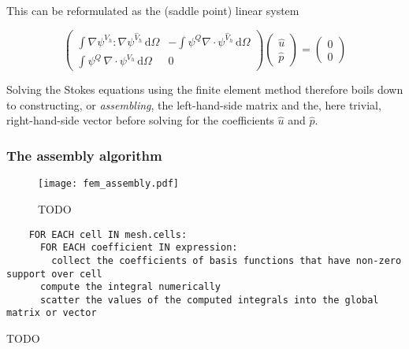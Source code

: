 \documentclass[thesis]{subfiles}
\begin{document}
This can be reformulated as the (saddle point) linear system

\begin{equation}
  \left (
  \begin{array}{c|c}
    \int \nabla \psi^{V_h} : \nabla \psi^{\hat V_h} \, \textrm{d}\Omega
    &
    - \int \psi^Q \nabla \cdot \psi^{\hat V_h} \, \textrm{d}\Omega \\
    \hline
    \int \psi^Q \, \nabla \cdot \psi^{V_h} \, \textrm{d}\Omega
    &
    0
  \end{array}
  \right )
  \left (
  \begin{array}{c}
    \hat u \\
    \hline
    \hat p
  \end{array}
  \right )
  =
  \left (
  \begin{array}{c}
    0 \\ \hline 0
  \end{array}
  \right )
  \label{eq:stokes_linear_system}
\end{equation}

Solving the Stokes equations using the finite element method therefore boils down to constructing, or \textit{assembling}, the left-hand-side matrix and the, here trivial, right-hand-side vector before solving for the coefficients $\hat u$ and $\hat p$.

\subsubsection{The assembly algorithm}

\begin{figure}
  \centering
  \texttt{[image: fem\_assembly.pdf]}
  \caption{TODO}
  \label{fig:fem_assembly}
\end{figure}

\begin{algorithm}
  \begin{verbatim}
    FOR EACH cell IN mesh.cells:
      FOR EACH coefficient IN expression:
        collect the coefficients of basis functions that have non-zero support over cell
      compute the integral numerically
      scatter the values of the computed integrals into the global matrix or vector
  \end{verbatim}
  \caption{TODO}
  \label{alg:fem_assembly}
\end{algorithm}
\end{document}
